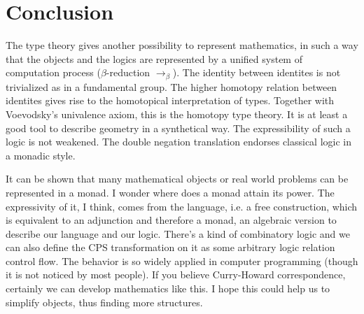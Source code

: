 \chapter*{Conclusion}

The type theory gives another possibility to represent mathematics,
in such a way that the objects and the logics are represented by a
unified system of computation process ($\beta$-reduction $\to_\beta$). 
The identity between identites is not trivialized as in a fundamental
group. The higher homotopy relation between identites gives rise to
the homotopical interpretation of types. Together with Voevodsky's
univalence axiom, this is the homotopy type theory. It is at least a
good tool to describe geometry in a synthetical way. The expressibility
of such a logic is not weakened. The double negation translation
endorses classical logic in a monadic style. 

It can be shown that many mathematical objects or real world problems
can be represented in a monad. I wonder where does a monad attain its
power. The expressivity of it, I think, comes from the language, i.e.
a free construction, which is equivalent to an adjunction and therefore
a monad, an algebraic version to describe our language and our logic. 
There's a kind of combinatory logic and we can also define the CPS
transformation on it as some arbitrary logic relation control flow. 
The behavior is so widely applied in computer programming (though
it is not noticed by most people). If you believe Curry-Howard
correspondence, certainly we can develop mathematics like this.
I hope this could help us to simplify objects, thus finding more
structures. 
